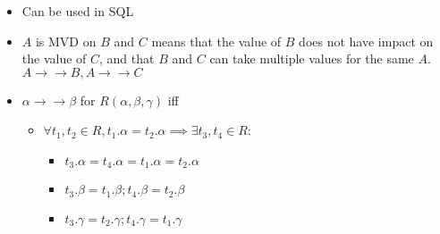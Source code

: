 \begin{itemize}
\begin{itemize}
\begin{itemize}
                \end{itemize}
            \item Can be used in SQL
        \end{itemize}
        \begin{itemize}
                \begin{itemize}
                    \item $A$ is MVD on $B$ and $C$ means that the value of $B$ does not have impact on the value of $C$, and that $B$ and $C$ can take multiple values for the same $A$.
                     $A \to \to B, A \to \to C$
                    \item $\alpha \to \to \beta$ for $R(\alpha, \beta, \gamma)$ iff
                        \begin{itemize}
                            \item $\forall t_1, t_2 \in R, t_1.\alpha = t_2.\alpha \implies \exists t_3,t_4 \in R$:
                                \begin{itemize}
                                    \item $t_3.\alpha = t_4.\alpha = t_1.\alpha = t_2.\alpha$
                                    \item $t_3.\beta = t_1.\beta; t_4.\beta = t_2.\beta$
                                    \item $t_3.\gamma = t_2.\gamma; t_4.\gamma = t_1.\gamma$


\end{itemize}
\end{itemize}
\end{itemize}
\end{itemize}
\end{itemize}
